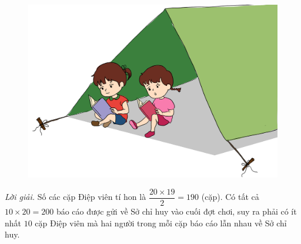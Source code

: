 \begin{multicols}{2}
	\begin{figure}[H]
		\centering
		\vspace*{-5pt}
		\captionsetup{labelformat= empty, justification=centering}
		\includegraphics[width=0.75\linewidth]{Pi7_bai6}
		\vspace*{-15pt}
	\end{figure}
	\textit{Lời giải.} Số các cặp Điệp viên tí hon là $\dfrac{20\times 19}{2} = 190$ (cặp). Có tất cả $10\times 20=200$ báo cáo được gửi về Sở chỉ huy vào cuối đợt chơi, suy ra phải có ít nhất $10$ cặp Điệp viên mà hai người trong mỗi cặp báo cáo lẫn nhau về Sở chỉ huy.
\end{multicols}

